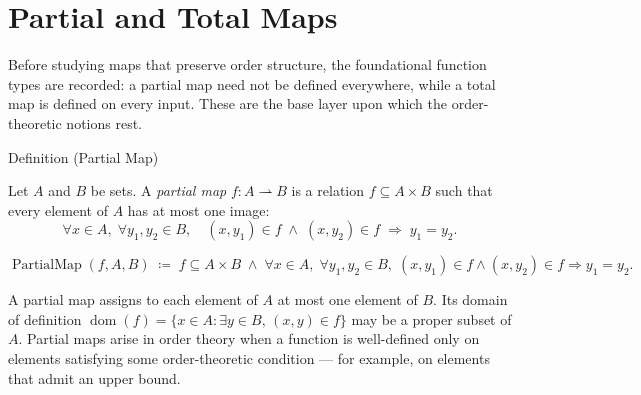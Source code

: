 
\section{Partial and Total Maps}
\label{sec:partial-total-maps}

\begin{remark*}
Before studying maps that preserve order structure, the foundational
function types are recorded: a partial map need not be defined everywhere,
while a total map is defined on every input.  These are the base layer
upon which the order-theoretic notions rest.
\end{remark*}


\begin{definitionbox}{Definition (Partial Map)}
\begin{definition}
\label{def:partial-map}
Let $A$ and $B$ be sets.  A \emph{partial map} $f : A \rightharpoonup B$
is a relation $f \subseteq A \times B$ such that every element of $A$ has
at most one image:
\[
\forall x \in A,\; \forall y_1, y_2 \in B,\quad
(x, y_1) \in f \;\land\; (x, y_2) \in f
\;\Longrightarrow\; y_1 = y_2.
\]
\end{definition}
\end{definitionbox}

\begin{remark*}
\[
\operatorname{PartialMap}(f, A, B)
\;\coloneqq\;
f \subseteq A \times B
\;\land\;
\forall x \in A,\; \forall y_1, y_2 \in B,\;
(x,y_1) \in f \land (x,y_2) \in f \Rightarrow y_1 = y_2.
\]
\end{remark*}

\begin{remark*}[Interpretation]
A partial map assigns to each element of $A$ at most one element of $B$.
Its domain of definition
$\operatorname{dom}(f) = \{x \in A : \exists y \in B,\, (x,y) \in f\}$
may be a proper subset of $A$.  Partial maps arise in order theory when
a function is well-defined only on elements satisfying some order-theoretic
condition — for example, on elements that admit an upper bound.
\end{remark*}

